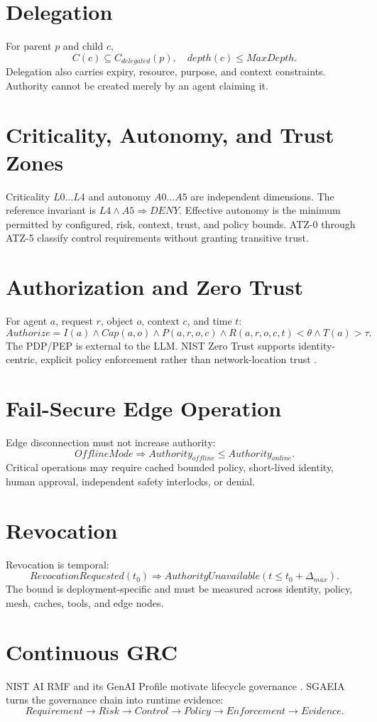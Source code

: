 \documentclass[11pt]{article}
\begin{document}
\section{Delegation}
For parent $p$ and child $c$,
\[
C(c)\subseteq C_{delegated}(p),\quad depth(c)\leq MaxDepth.
\]
Delegation also carries expiry, resource, purpose, and context constraints. Authority cannot be created merely by an agent claiming it.

\section{Criticality, Autonomy, and Trust Zones}
Criticality $L0\ldots L4$ and autonomy $A0\ldots A5$ are independent dimensions. The reference invariant is $L4\land A5\Rightarrow DENY$. Effective autonomy is the minimum permitted by configured, risk, context, trust, and policy bounds. ATZ-0 through ATZ-5 classify control requirements without granting transitive trust.

\section{Authorization and Zero Trust}
For agent $a$, request $r$, object $o$, context $c$, and time $t$:
\[
Authorize=I(a)\land Cap(a,o)\land P(a,r,o,c)\land R(a,r,o,c,t)<\theta\land T(a)>\tau.
\]
The PDP/PEP is external to the LLM. NIST Zero Trust supports identity-centric, explicit policy enforcement rather than network-location trust \cite{nist207,nist207a}.

\section{Fail-Secure Edge Operation}
Edge disconnection must not increase authority:
\[
OfflineMode\Rightarrow Authority_{offline}\leq Authority_{online}.
\]
Critical operations may require cached bounded policy, short-lived identity, human approval, independent safety interlocks, or denial.

\section{Revocation}
Revocation is temporal:
\[
RevocationRequested(t_0)\Rightarrow AuthorityUnavailable(t\leq t_0+\Delta_{max}).
\]
The bound is deployment-specific and must be measured across identity, policy, mesh, caches, tools, and edge nodes.

\section{Continuous GRC}
NIST AI RMF and its GenAI Profile motivate lifecycle governance \cite{nistrmf,nistgenai}. SGAEIA turns the governance chain into runtime evidence:
\[
Requirement\rightarrow Risk\rightarrow Control\rightarrow Policy\rightarrow Enforcement\rightarrow Evidence.
\]
\end{document}
